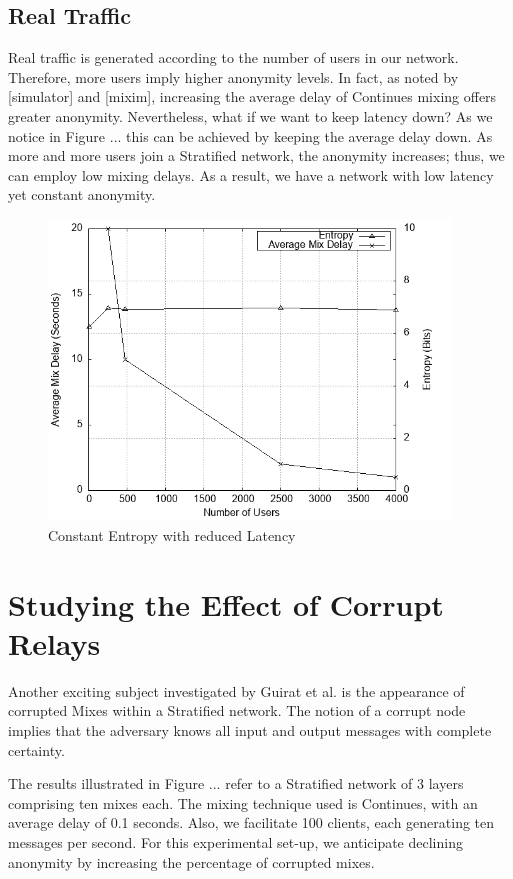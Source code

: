\documentclass[logo,msc,cyber]{infthesis}   %
\begin{document}
\subsection{Real Traffic}

Real traffic is generated according to the number of users in our network.
Therefore, more users imply higher anonymity levels. In fact, as noted by
[simulator] and [mixim], increasing the average delay of Continues mixing offers
greater anonymity. Nevertheless, what if we want to keep latency down? As we
notice in Figure ... this can be achieved by keeping the average delay down. As
more and more users join a Stratified network, the anonymity increases; thus, we
can employ low mixing delays. As a result, we have a network with low latency
yet constant anonymity.

\begin{figure}[h!]
    \centering
    \includegraphics[height=8cm]{figures/simulator/5.png}
    \caption{Constant Entropy with reduced Latency}
    \label{fig:nym-stratified-low-latency-constant-anonymity}
 \end{figure}

\section{Studying the Effect of Corrupt Relays}

Another exciting subject investigated by Guirat et al. is the appearance of
corrupted Mixes within a Stratified network. The notion of a corrupt node
implies that the adversary knows all input and output messages with complete
certainty. 

The results illustrated in Figure ... refer to a Stratified network of 3 layers
comprising ten mixes each. The mixing technique used is Continues, with an
average delay of 0.1 seconds. Also, we facilitate 100 clients, each generating
ten messages per second. For this experimental set-up, we anticipate declining
anonymity by increasing the percentage of corrupted mixes. 
\end{document}
